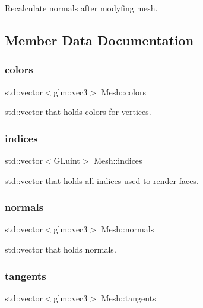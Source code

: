 Recalculate normals after modyfing mesh. 



\subsection{Member Data Documentation}
\mbox{\label{class_mesh_a484b6f05575dbac43b3f5de817f90069}} 
\subsubsection{\texorpdfstring{colors}{colors}}
{\footnotesize\ttfamily std\+::vector$<$glm\+::vec3$>$ Mesh\+::colors}



std\+::vector that holds colors for vertices. 

\mbox{\label{class_mesh_a5e55b84c6c967608bcf23ed7d68e4215}} 
\subsubsection{\texorpdfstring{indices}{indices}}
{\footnotesize\ttfamily std\+::vector$<$G\+Luint$>$ Mesh\+::indices}



std\+::vector that holds all indices used to render faces. 

\mbox{\label{class_mesh_a51622ff35f286e2015954aad76ee4bc2}} 
\subsubsection{\texorpdfstring{normals}{normals}}
{\footnotesize\ttfamily std\+::vector$<$glm\+::vec3$>$ Mesh\+::normals}



std\+::vector that holds normals. 

\mbox{\label{class_mesh_aabfc88c0c59371aca2d8fe6227a1c3f1}} 
\subsubsection{\texorpdfstring{tangents}{tangents}}
{\footnotesize\ttfamily std\+::vector$<$glm\+::vec3$>$ Mesh\+::tangents}



